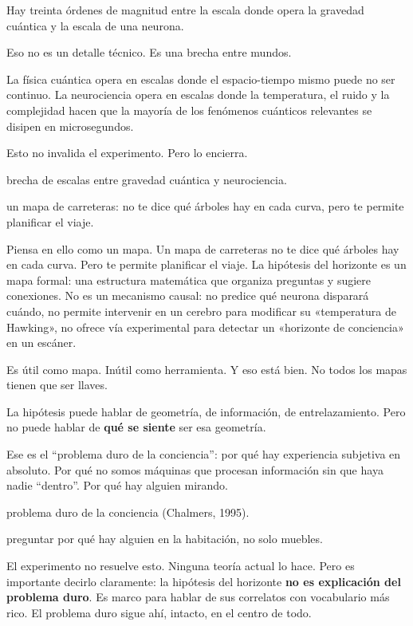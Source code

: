\noindent Hay treinta órdenes de magnitud entre la escala donde opera la gravedad cuántica y la escala de una neurona.

Eso no es un detalle técnico. Es una brecha entre mundos.

La física cuántica opera en escalas donde el espacio-tiempo mismo puede no ser continuo. La neurociencia opera en escalas donde la temperatura, el ruido y la complejidad hacen que la mayoría de los fenómenos cuánticos relevantes se disipen en microsegundos.

Esto no invalida el experimento. Pero lo encierra.

\begin{fisica}
 brecha de escalas entre gravedad cuántica y neurociencia.

 un mapa de carreteras: no te dice qué árboles hay en cada curva, pero te permite planificar el viaje.
\end{fisica}
Piensa en ello como un mapa. Un mapa de carreteras no te dice qué árboles hay en cada curva. Pero te permite planificar el viaje. La hipótesis del horizonte es un mapa formal: una estructura matemática que organiza preguntas y sugiere conexiones. No es un mecanismo causal: no predice qué neurona disparará cuándo, no permite intervenir en un cerebro para modificar su «temperatura de Hawking», no ofrece vía experimental para detectar un «horizonte de conciencia» en un escáner.

Es útil como mapa. Inútil como herramienta. Y eso está bien. No todos los mapas tienen que ser llaves.

\noindent La hipótesis puede hablar de geometría, de información, de entrelazamiento. Pero no puede hablar de \textbf{qué se siente} ser esa geometría.

Ese es el “problema duro de la conciencia”: por qué hay experiencia subjetiva en absoluto. Por qué no somos máquinas que procesan información sin que haya nadie “dentro”. Por qué hay alguien mirando.

\begin{fisica}
 problema duro de la conciencia (Chalmers, 1995).

 preguntar por qué hay alguien en la habitación, no solo muebles.
\end{fisica}
El experimento no resuelve esto. Ninguna teoría actual lo hace. Pero es importante decirlo claramente: la hipótesis del horizonte \textbf{no es explicación del problema duro}. Es marco para hablar de sus correlatos con vocabulario más rico. El problema duro sigue ahí, intacto, en el centro de todo.


